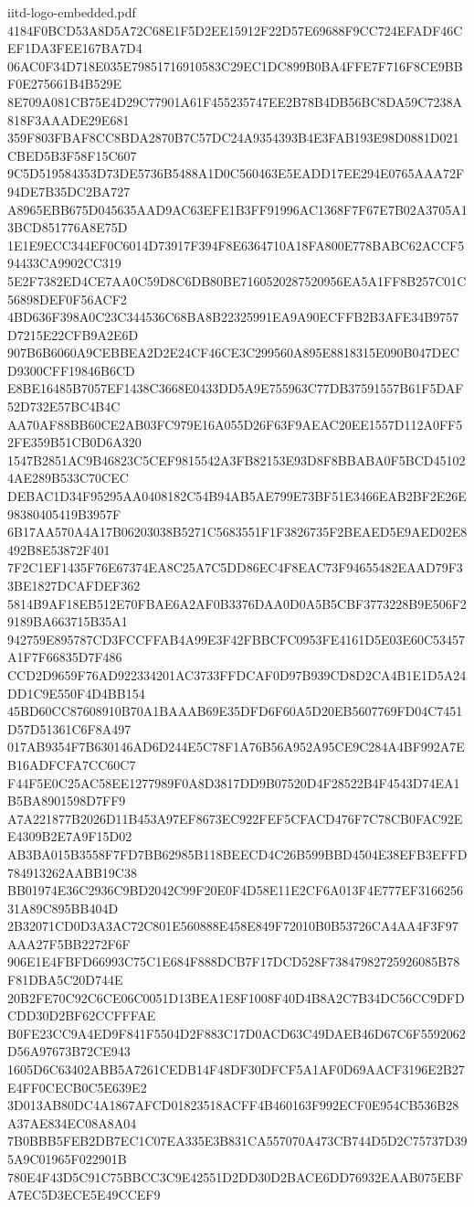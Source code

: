 \begin{filecontents*}[overwrite]{iitd-logo-embedded.pdf}
4184F0BCD53A8D5A72C68E1F5D2EE15912F22D57E69688F9CC724EFADF46CEF1DA3FEE167BA7D4
06AC0F34D718E035E79851716910583C29EC1DC899B0BA4FFE7F716F8CE9BBF0E275661B4B529E
8E709A081CB75E4D29C77901A61F455235747EE2B78B4DB56BC8DA59C7238A818F3AAADE29E681
359F803FBAF8CC8BDA2870B7C57DC24A9354393B4E3FAB193E98D0881D021CBED5B3F58F15C607
9C5D519584353D73DE5736B5488A1D0C560463E5EADD17EE294E0765AAA72F94DE7B35DC2BA727
A8965EBB675D045635AAD9AC63EFE1B3FF91996AC1368F7F67E7B02A3705A13BCD851776A8E75D
1E1E9ECC344EF0C6014D73917F394F8E6364710A18FA800E778BABC62ACCF594433CA9902CC319
5E2F7382ED4CE7AA0C59D8C6DB80BE7160520287520956EA5A1FF8B257C01C56898DEF0F56ACF2
4BD636F398A0C23C344536C68BA8B22325991EA9A90ECFFB2B3AFE34B9757D7215E22CFB9A2E6D
907B6B6060A9CEBBEA2D2E24CF46CE3C299560A895E8818315E090B047DECD9300CFF19846B6CD
E8BE16485B7057EF1438C3668E0433DD5A9E755963C77DB37591557B61F5DAF52D732E57BC4B4C
AA70AF88BB60CE2AB03FC979E16A055D26F63F9AEAC20EE1557D112A0FF52FE359B51CB0D6A320
1547B2851AC9B46823C5CEF9815542A3FB82153E93D8F8BBABA0F5BCD451024AE289B533C70CEC
DEBAC1D34F95295AA0408182C54B94AB5AE799E73BF51E3466EAB2BF2E26E98380405419B3957F
6B17AA570A4A17B06203038B5271C5683551F1F3826735F2BEAED5E9AED02E8492B8E53872F401
7F2C1EF1435F76E67374EA8C25A7C5DD86EC4F8EAC73F94655482EAAD79F33BE1827DCAFDEF362
5814B9AF18EB512E70FBAE6A2AF0B3376DAA0D0A5B5CBF3773228B9E506F29189BA663715B35A1
942759E895787CD3FCCFFAB4A99E3F42FBBCFC0953FE4161D5E03E60C53457A1F7F66835D7F486
CCD2D9659F76AD922334201AC3733FFDCAF0D97B939CD8D2CA4B1E1D5A24DD1C9E550F4D4BB154
45BD60CC87608910B70A1BAAAB69E35DFD6F60A5D20EB5607769FD04C7451D57D51361C6F8A497
017AB9354F7B630146AD6D244E5C78F1A76B56A952A95CE9C284A4BF992A7EB16ADFCFA7CC60C7
F44F5E0C25AC58EE1277989F0A8D3817DD9B07520D4F28522B4F4543D74EA1B5BA8901598D7FF9
A7A221877B2026D11B453A97EF8673EC922FEF5CFACD476F7C78CB0FAC92EE4309B2E7A9F15D02
AB3BA015B3558F7FD7BB62985B118BEECD4C26B599BBD4504E38EFB3EFFD784913262AABB19C38
BB01974E36C2936C9BD2042C99F20E0F4D58E11E2CF6A013F4E777EF316625631A89C895BB404D
2B32071CD0D3A3AC72C801E560888E458E849F72010B0B53726CA4AA4F3F97AAA27F5BB2272F6F
906E1E4FBFD66993C75C1E684F888DCB7F17DCD528F73847982725926085B78F81DBA5C20D744E
20B2FE70C92C6CE06C0051D13BEA1E8F1008F40D4B8A2C7B34DC56CC9DFDCDD30D2BF62CCFFFAE
B0FE23CC9A4ED9F841F5504D2F883C17D0ACD63C49DAEB46D67C6F5592062D56A97673B72CE943
1605D6C63402ABB5A7261CEDB14F48DF30DFCF5A1AF0D69AACF3196E2B27E4FF0CECB0C5E639E2
3D013AB80DC4A1867AFCD01823518ACFF4B460163F992ECF0E954CB536B28A37AE834EC08A8A04
7B0BBB5FEB2DB7EC1C07EA335E3B831CA557070A473CB744D5D2C75737D395A9C01965F022901B
780E4F43D5C91C75BBCC3C9E42551D2DD30D2BACE6DD76932EAAB075EBFA7EC5D3ECE5E49CCEF9

\end{filecontents*}
